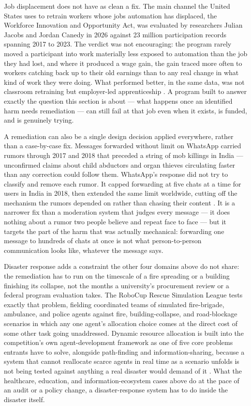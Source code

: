 Job displacement does not have as clean a fix. The main channel the United States uses to retrain workers whose jobs automation has displaced, the Workforce Innovation and Opportunity Act, was evaluated by researchers Julian Jacobs and Jordan Canedy in 2026 against 23 million participation records spanning 2017 to 2023. The verdict was not encouraging: the program rarely moved a participant into work materially less exposed to automation than the job they had lost, and where it produced a wage gain, the gain traced more often to workers catching back up to their old earnings than to any real change in what kind of work they were doing. What performed better, in the same data, was not classroom retraining but employer-led apprenticeship \autocite{jacobs2026wioa}. A program built to answer exactly the question this section is about — what happens once an identified harm needs remediation — can still fail at that job even when it exists, is funded, and is genuinely trying.

A remediation can also be a single design decision applied everywhere, rather than a case-by-case fix. Messages forwarded without limit on WhatsApp carried rumors through 2017 and 2018 that preceded a string of mob killings in India — unconfirmed claims about child abductors and organ thieves circulating faster than any correction could follow them. WhatsApp's response did not try to classify and remove each rumor. It capped forwarding at five chats at a time for users in India in 2018, then extended the same limit worldwide, cutting off the mechanism the rumors depended on rather than chasing their content \autocite{whatsapp2019forwarding}. It is a narrower fix than a moderation system that judges every message — it does nothing about a rumor two people believe and repeat face to face — but it targets the part of the harm that was actually mechanical: forwarding one message to hundreds of chats at once is not what person-to-person communication looks like, whatever the message says.

Disaster response adds a constraint the other four domains above do not share: the remediation has to run on the timescale of a fire spreading or a building finishing its collapse, not the months a university's procurement review or a federal program evaluation takes. The RoboCup Rescue Simulation League tests exactly that problem, fielding coordinated teams of simulated fire-brigade, ambulance, and police agents against fire, building-collapse, and road-blockage scenarios in which any one agent's allocation choice comes at the direct cost of some other task going unaddressed. Dynamic resource allocation is built into the competition's own agent-development framework as one of five core problems entrants have to solve, alongside path-finding and information-sharing, because a system that cannot reallocate scarce agents in real time as a scenario unfolds is not being tested against anything a real disaster would demand of it \autocite{robocup2025rescue}. What the healthcare, education, and information-ecosystem cases above do at the pace of an audit or a policy change, a disaster-response system has to do inside the disaster itself.


